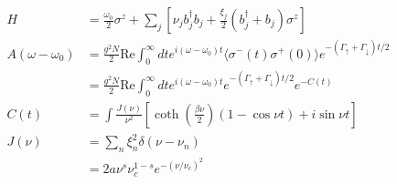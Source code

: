 \documentclass[a4paper]{article}
\begin{document}
\pagestyle{empty}
\begin{align*}
		H &= \frac{\omega_0}{2}\sigma^z + \sum_j \left[ \nu_j b^\dagger_j b_j +
		\frac{\xi_j}{2}\left( b^\dagger_j + b_j \right)\sigma^z \right] \\
		A(\omega-\omega_0) &= \frac{g^2 N}{2} \text{Re} \int_0^\infty
		dt e^{i (\omega-\omega_0) t} \langle \sigma^-(t) \sigma^+(0) \rangle 
		e^{-(\Gamma_\uparrow + \Gamma_\downarrow)t / 2} \\
		&= \frac{g^2 N}{2} \text{Re} \int_0^\infty
		dt e^{i (\omega-\omega_0) t} e^{-(\Gamma_\uparrow + \Gamma_\downarrow)t 
		/ 2} e^{-C(t)} \\
		C(t) &= \int \frac{J(\nu)}{\nu^2}
		\left[ \coth\left( \frac{\beta \nu}{2} \right)
		\left( 1- \cos \nu t \right)
	 +i \sin \nu t\right] \\
		J(\nu) &= \sum_n \xi^2_n \delta(\nu-\nu_n) \\
		&= 2 a \nu^s\nu^{1-s}_c e^{-(\nu/\nu_c)^2}
\end{align*}
\end{document}
